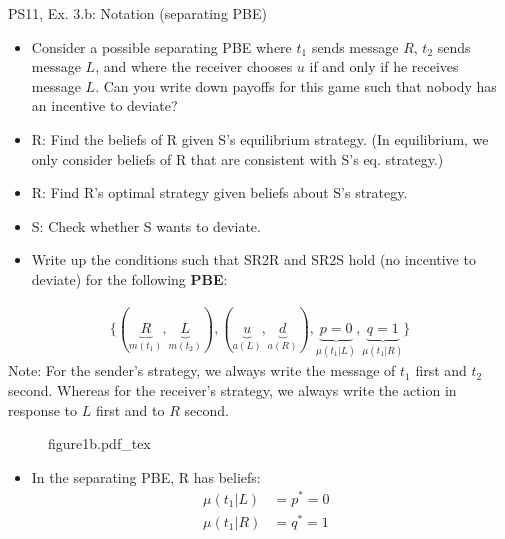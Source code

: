 \begin{frame}{PS11, Ex. 3.b: Notation (separating PBE)}
    \begin{itemize}
        \item[(b)] Consider a possible separating PBE where $t_1$ sends message $R$, $t_2$ sends message $L$, and where the receiver chooses $u$ if and only if he receives message $L$. Can you write down payoffs for this game such that nobody has an incentive to deviate?
    \end{itemize} \vspace{-8pt}
    \begin{multicols}{2}
      \begin{itemize}
        \item[SR3:] R: Find the beliefs of R given S's equilibrium strategy. (In equilibrium, we only consider beliefs of R that are consistent with S's eq. strategy.)
        \item[SR2R:] R: Find R's optimal strategy given beliefs about S's strategy.
        \item[SR2S:] S: Check whether S wants to deviate.
        \item[PBE:]  Write up the conditions such that SR2R and SR2S hold (no incentive to deviate) for the following \textbf{PBE}:
      \end{itemize}\vspace{-14pt}
      \begin{align*}
        \{(\underbrace{R}_{m(t_1)},\underbrace{L}_{m(t_2)}),(\underbrace{u}_{a(L)},\underbrace{d}_{a(R)}),\underbrace{p=0}_{\mu(t_1|L)},\underbrace{q=1}_{\mu(t_1|R)}\}
      \end{align*}
      Note: For the sender's strategy, we always write the message of $t_1$ first and $t_2$ second. Whereas for the receiver's strategy, we always write the action in response to $L$ first and to $R$ second.
      \vfill\null\columnbreak
      \begin{figure}[!h]
        \center
        \def\svgwidth{\columnwidth}
        {figure1b.pdf_tex}
      \end{figure} \vspace{-9pt}
      \begin{itemize}
        \item[SR3:] In the separating PBE, R has beliefs:\vspace{-10pt}
        \begin{align*}
          \mu(t_1|L)&=p^*=0&\\
          \mu(t_1|R)&=q^*=1
        \end{align*}

\end{itemize}
\end{multicols}
\end{frame}
